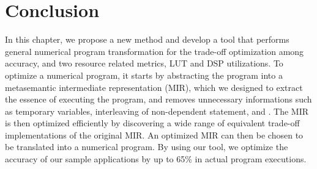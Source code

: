 \section{Conclusion}
\label{sec:conclusion}

In this chapter, we propose a new method and develop a tool that performs general
numerical program transformation for the trade-off optimization among accuracy,
and two resource related metrics, LUT and DSP utilizations.  To optimize a
numerical program, it starts by abstracting the program into a metasemantic
intermediate representation (MIR), which we designed to extract the essence of
executing the program, and removes unnecessary informations such as temporary
variables, interleaving of non-dependent statement, and \etc.  The MIR is then
optimized efficiently by discovering a wide range of equivalent trade-off
implementations of the original MIR\@.  An optimized MIR can then be chosen to
be translated into a numerical program.  By using our tool, we optimize the
accuracy of our sample applications by up to 65\% in actual program executions.

